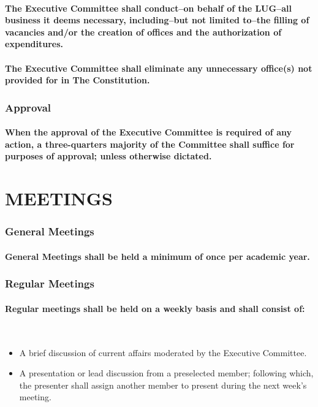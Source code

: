 \documentclass[letter]{report}
\begin{document}
\subsection{The Executive Committee shall conduct--on behalf of the LUG--all business it deems necessary, including--but not limited to--the filling of vacancies and/or the creation of offices and the authorization of expenditures.
}
\subsection{The Executive Committee shall eliminate any unnecessary office(s) not provided for in The Constitution.}
\section{Approval}
\subsection{When the approval of the Executive Committee is required of any action, a three-quarters majority of the Committee shall suffice for purposes of approval; unless otherwise dictated.}
\part{MEETINGS}
\section{General Meetings}
\subsection{General Meetings shall be held a minimum of once per academic year.}

\section{Regular Meetings}
\subsection{Regular meetings shall be held on a weekly basis and shall consist of:}\
\begin{itemize}
\item A brief discussion of current affairs moderated by the Executive Committee.
\item A presentation or lead discussion from a preselected member; following which, the presenter shall assign another member to present during the next week's meeting.
\end{itemize}
\end{document}
